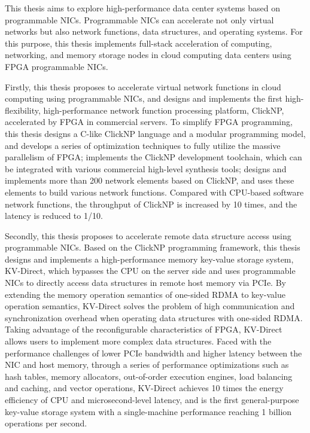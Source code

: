 This thesis aims to explore high-performance data center systems based on programmable NICs. Programmable NICs can accelerate not only virtual networks but also network functions, data structures, and operating systems. For this purpose, this thesis implements full-stack acceleration of computing, networking, and memory storage nodes in cloud computing data centers using FPGA programmable NICs.

Firstly, this thesis proposes to accelerate virtual network functions in cloud computing using programmable NICs, and designs and implements the first high-flexibility, high-performance network function processing platform, ClickNP, accelerated by FPGA in commercial servers. To simplify FPGA programming, this thesis designs a C-like ClickNP language and a modular programming model, and develops a series of optimization techniques to fully utilize the massive parallelism of FPGA; implements the ClickNP development toolchain, which can be integrated with various commercial high-level synthesis tools; designs and implements more than 200 network elements based on ClickNP, and uses these elements to build various network functions. Compared with CPU-based software network functions, the throughput of ClickNP is increased by 10 times, and the latency is reduced to 1/10.

Secondly, this thesis proposes to accelerate remote data structure access using programmable NICs. Based on the ClickNP programming framework, this thesis designs and implements a high-performance memory key-value storage system, KV-Direct, which bypasses the CPU on the server side and uses programmable NICs to directly access data structures in remote host memory via PCIe. By extending the memory operation semantics of one-sided RDMA to key-value operation semantics, KV-Direct solves the problem of high communication and synchronization overhead when operating data structures with one-sided RDMA. Taking advantage of the reconfigurable characteristics of FPGA, KV-Direct allows users to implement more complex data structures. Faced with the performance challenges of lower PCIe bandwidth and higher latency between the NIC and host memory, through a series of performance optimizations such as hash tables, memory allocators, out-of-order execution engines, load balancing and caching, and vector operations, KV-Direct achieves 10 times the energy efficiency of CPU and microsecond-level latency, and is the first general-purpose key-value storage system with a single-machine performance reaching 1 billion operations per second.

